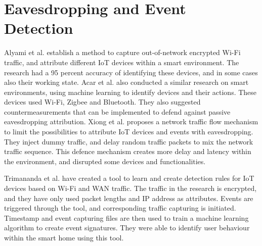 \section{Eavesdropping and Event Detection}
Alyami et al. \cite{Eavs_relat_alyami2022wifi} establish a method to capture out-of-network encrypted Wi-Fi traffic, and attribute different IoT devices within a smart environment. The research had a 95 percent accuracy of identifying these devices, and in some cases also their working state. Acar et al. \cite{evas_relat_acar2020peek} also conducted a similar research on smart environments, using machine learning to identify devices and their actions. These devices used Wi-Fi, Zigbee and Bluetooth. They also suggested countermeasurements that can be implemented to defend against passive eavesdropping attribution.
Xiong et al. \cite{evas_relat_xiong2022network} proposes a network traffic flow mechanism to limit the possibilities to attribute IoT devices and events with eavesdropping. They inject dummy traffic, and delay random traffic packets to mix the network traffic sequence. This defence mechanism creates more delay and latency within the environment, and disrupted some devices and functionalities.

Trimananda et al. \cite{pingpong_trimananda2020packet} have created a tool to learn and create detection rules for IoT devices based on Wi-Fi and WAN traffic. The traffic in the research is encrypted, and they have only used packet lengths and IP address as attributes. Events are triggered through the tool, and corresponding traffic capturing is initiated. Timestamp and event capturing files are then used to train a machine learning algorithm to create event signatures. They were able to identify user behaviour within the smart home using this tool. 


